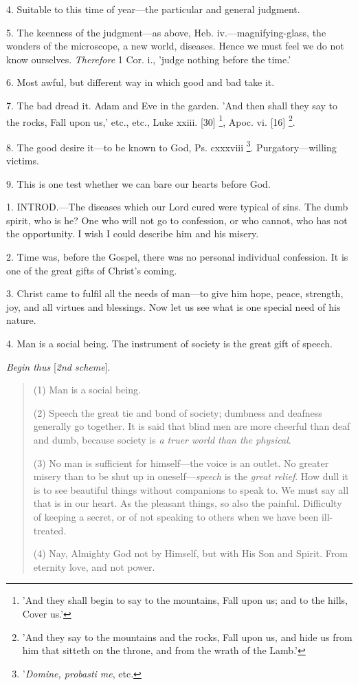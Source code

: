 4. Suitable to this time of year—the particular
and general judgment.

5. The keenness of the judgment—as above, Heb.
iv.—magnifying-glass, the wonders of the microscope, a new world,
diseases. Hence we must feel we do not know ourselves. \emph{Therefore}
1 Cor. i., 'judge nothing before the time.'

6. Most awful, but different way in which good
and bad take it.

7. The bad dread it. Adam and Eve in the garden.
'And then shall they say to the rocks, Fall upon us,' etc., etc., Luke
xxiii. [30] \footnote{'And they shall begin to
say to the mountains, Fall upon us; and to the hills, Cover us.'}, Apoc. vi.
[16] \footnote{'And they say to the
mountains and the rocks, Fall upon us, and hide us from him that
sitteth on the throne, and from the wrath of the Lamb.'}.

8. The good desire it—to be known to God, Ps.
cxxxviii \footnote{'\emph{Domine, probasti me},
etc.}.
Purgatory—willing victims.

9. This is one test whether we can bare our
hearts before God.


1. INTROD.—The
diseases which our Lord cured were typical of sins. The dumb spirit,
who is he? One who will not go to confession, or who cannot, who has
not the opportunity. I wish I could describe him and his misery.

2. Time was, before the Gospel, there was no
personal individual confession. It is one of the great gifts of Christ's
coming.

3. Christ came to fulfil all the needs of
man—to give him hope, peace, strength, joy, and all virtues and
blessings. Now let us see what is one special need of his nature.

4. Man is a social being. The instrument of
society is the great gift of speech.

\emph{Begin thus} [\emph{2nd scheme}].

\begin{quote}

(1) Man is a social being.

(2) Speech the great tie and bond of society; dumbness and deafness
generally go together. It is said that blind men are more cheerful
than deaf and dumb, because society is \emph{a truer world than the
physical}.

(3) No man is sufficient for himself—the voice is an outlet. No
greater misery than to be shut up in oneself—\emph{speech} is the \emph{great
relief}. How dull it is to see beautiful things without
companions to speak to. We must say all that is in our heart. As the
pleasant things, so also the painful. Difficulty of keeping a
secret, or of not speaking to others when we have been ill-treated.

(4) Nay, Almighty God not by Himself, but with His Son and Spirit.
From eternity love, and not power.

\end{quote}

